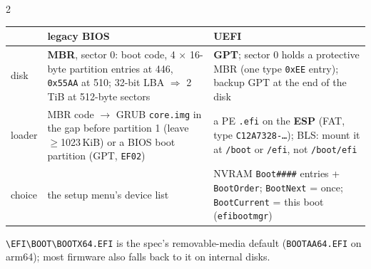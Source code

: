 \documentclass[8pt]{extarticle}
\newcommand\ct{\texttt}
\newcommand\dd{\hbox{-}\hbox{-}}
\newcommand\bs{\textbackslash}
\newcommand\hd[1]{\par\vspace{2pt}\noindent{\bfseries\color{sheetBlue}#1}\par\vspace{1pt}}
\begin{document}

\begin{multicols}{2}
\raggedright\footnotesize{}

\hd{Firmware — BIOS vs UEFI}
{\scriptsize\setlength{\tabcolsep}{2pt}
\begin{tabular}{@{}>{\raggedright\arraybackslash}p{8mm}>{\raggedright\arraybackslash}p{32mm}>{\raggedright\arraybackslash}p{37mm}@{}}
\toprule
 & \textbf{legacy BIOS} & \textbf{UEFI} \\ \midrule
disk & \textbf{MBR}, sector 0: boot code, 4 × 16-byte partition entries at 446, \ct{0x55AA} at 510; 32-bit LBA $\Rightarrow$ 2\,TiB at 512-byte sectors & \textbf{GPT}; sector 0 holds a protective MBR (one type \ct{0xEE} entry); backup GPT at the end of the disk \\
loader & MBR code $\rightarrow$ GRUB \ct{core.img} in the gap before partition 1 (leave $\ge$1023\,KiB) or a BIOS boot partition (GPT, \ct{EF02}) & a PE \ct{.efi} on the \textbf{ESP} (FAT, type \ct{C12A7328-…}); BLS: mount it at \ct{/boot} or \ct{/efi}, not \ct{/boot/efi} \\
choice & the setup menu's device list & NVRAM \ct{Boot\#\#\#\#} entries + \ct{BootOrder}; \ct{BootNext} = once; \ct{BootCurrent} = this boot (\ct{efibootmgr}) \\
\bottomrule
\end{tabular}}\par
\ct{\bs EFI\bs BOOT\bs BOOTX64.EFI} is the spec's removable-media default (\ct{BOOTAA64.EFI} on
arm64); most firmware also falls back to it on internal disks\unverified.


\end{multicols}
\end{document}
